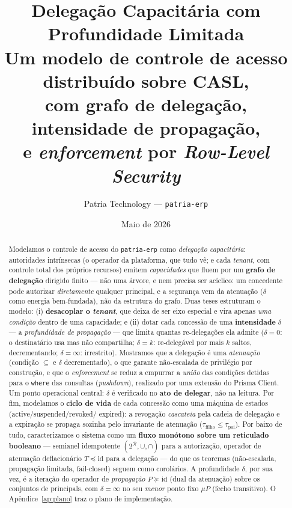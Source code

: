 \documentclass[11pt,a4paper]{article}
\title{\textbf{Delegação Capacitária com Profundidade Limitada}\\[2mm]
  \large Um modelo de controle de acesso distribuído sobre CASL,\\
  com grafo de delegação, intensidade de propagação,\\
  e \emph{enforcement} por \emph{Row-Level Security}}
\author{Patria Technology --- \texttt{patria-erp}}
\date{Maio de 2026}
\theoremstyle{definition}
\newcommand{\R}{\mathcal{R}}
\newcommand{\dep}{\delta}
\begin{document}
  \maketitle

  \begin{abstract}
  Modelamos o controle de acesso do \texttt{patria-erp} como \emph{delegação
  capacitária}: autoridades intrínsecas (o operador da plataforma, que tudo
  vê; e cada \emph{tenant}, com controle total dos próprios recursos) emitem
  \emph{capacidades} que fluem por um \textbf{grafo de delegação} dirigido
  finito --- não uma árvore, e nem precisa ser acíclico: um concedente pode
  autorizar \emph{diretamente} qualquer principal, e a segurança vem da
  atenuação ($\dep$ como energia bem-fundada), não da estrutura do grafo.
  Duas teses estruturam o modelo: (i) \textbf{desacoplar o \emph{tenant}},
  que deixa de ser eixo especial e vira apenas \emph{uma condição} dentro de
  uma capacidade; e (ii) dotar cada concessão de uma \textbf{intensidade}
  $\dep$ --- a \emph{profundidade de propagação} --- que limita quantas
  re-delegações ela admite ($\dep=0$: o destinatário usa mas não compartilha;
  $\dep=k$: re-delegável por mais $k$ saltos, decrementando; $\dep=\infty$:
  irrestrito). Mostramos que a delegação é uma \emph{atenuação} (condição
  $\subseteq$ e $\dep$ decrementado), o que garante não-escalada de
  privilégio por construção, e que o \emph{enforcement} se reduz a empurrar a
  \emph{união} das condições detidas para o \texttt{where} das consultas
  (\emph{pushdown}), realizado por uma extensão do Prisma Client. Um ponto
  operacional central: $\dep$ é verificado no \textbf{ato de delegar}, não na
  leitura. Por fim, modelamos o \textbf{ciclo de vida} de cada concessão como
  uma máquina de estados (\textsf{active}/\textsf{suspended}/\textsf{revoked}/
  \textsf{expired}): a revogação \emph{cascateia} pela cadeia de delegação e a
  expiração se propaga sozinha pelo invariante de atenuação
  ($\tau_{\text{filho}}\le\tau_{\text{pai}}$). Por baixo de tudo,
  caracterizamos o sistema como um \textbf{fluxo monótono sobre um reticulado
  booleano} --- semianel idempotente $(2^{\R},\cup,\cap)$ para a autorização,
  operador de atenuação deflacionário $T\preceq\mathrm{id}$ para a delegação ---
  do que os teoremas (não-escalada, propagação limitada, fail-closed) seguem
  como corolários. A profundidade $\dep$, por sua vez, é a iteração do operador
  de \emph{propagação} $P\succeq\mathrm{id}$ (dual da atenuação) sobre os
  conjuntos de principals, com $\dep=\infty$ no seu \emph{menor} ponto fixo
  $\mu P$ (fecho transitivo). O Apêndice~\ref{ap:plano} traz o plano de
  implementação.
  \end{abstract}
\end{document}
